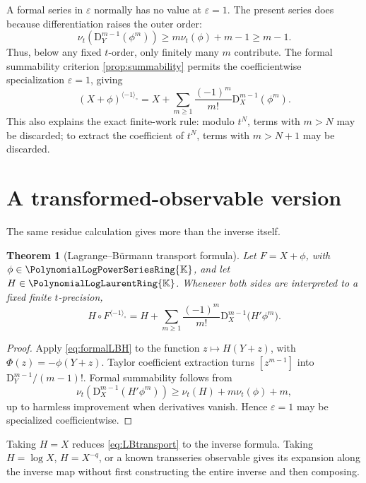 \documentclass[11pt,oneside,openany]{book}
\newtheorem{theorem}{Theorem}[chapter]
\newcommand{\K}{\mathbb{K}}
\newcommand{\Rring}{\PolynomialLogPowerSeriesRing{\K}}
\newcommand{\Pring}{\PolynomialLogLaurentRing{\K}}
\newcommand{\ordt}{\nu_t}
\newcommand{\compose}{\mathbin{\circ}}
\newcommand{\rev}{^{\langle-1\rangle_{\circ}}}
\newcommand{\D}{\mathrm{D}}
\newcommand{\eps}{\varepsilon}
\begin{document}
A formal series in \(\eps\) normally has no value at \(\eps=1\).  The present
series does because differentiation raises the outer order:
\begin{equation}\label{eq:lagrangeorderappendix}
 \ordt\!\left(\D_Y^{m-1}(\phi^m)\right)
 \geq m\ordt(\phi)+m-1\geq m-1.
\end{equation}
Thus, below any fixed \(t\)-order, only finitely many \(m\) contribute.
The formal summability criterion \cref{prop:summability} permits the
coefficientwise specialization \(\eps=1\), giving
\[
 (X+\phi)\rev
 =X+\sum_{m\geq1}\frac{(-1)^m}{m!}
 \D_X^{m-1}(\phi^m).
\]
This also explains the exact finite-work rule: modulo \(t^N\), terms with
\(m>N\) may be discarded; to extract the coefficient of \(t^N\), terms with
\(m>N+1\) may be discarded.

\section{A transformed-observable version}
The same residue calculation gives more than the inverse itself.

\begin{theorem}[Lagrange--Bürmann transport formula]
\label{thm:LBtransport}
Let \(F=X+\phi\), with \(\phi\in\Rring\), and let \(H\in\Pring\).  Whenever
both sides are interpreted to a fixed finite \(t\)-precision,
\begin{equation}\label{eq:LBtransport}
 H\compose F\rev
 =H+\sum_{m\geq1}\frac{(-1)^m}{m!}
 \D_X^{m-1}\bigl(H'\phi^m\bigr).
\end{equation}
\end{theorem}

\begin{proof}
Apply \cref{eq:formalLBH} to the function \(z\mapsto H(Y+z)\), with
\(\Phi(z)=-\phi(Y+z)\).  Taylor coefficient extraction turns
\([z^{m-1}]\) into \(\D_Y^{m-1}/(m-1)!\).  Formal summability follows from
\[
 \ordt\!\left(\D_X^{m-1}(H'\phi^m)\right)
 \geq \ordt(H)+m\ordt(\phi)+m,
\]
up to harmless improvement when derivatives vanish.  Hence \(\eps=1\) may be
specialized coefficientwise.
\end{proof}

Taking \(H=X\) reduces \cref{eq:LBtransport} to the inverse formula.  Taking
\(H=\log X\), \(H=X^{-q}\), or a known transseries observable gives its
expansion along the inverse map without first constructing the entire inverse
and then composing.
\end{document}
